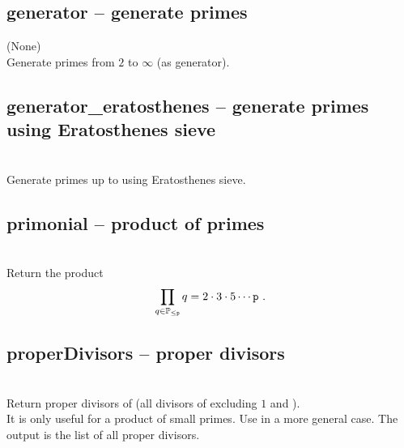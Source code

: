  \subsection{generator -- generate primes}
   {(None)}{}\\
   \spacing
   \quad Generate primes from $2$ to $\infty$ (as generator).\\
   \spacing
%
 \subsection{generator\_eratosthenes -- generate primes using Eratosthenes sieve}
   {}{}\\
   \spacing
   \quad Generate primes up to  using Eratosthenes sieve.\\
   \spacing
%
 \subsection{primonial -- product of primes}
   {}{}\\
   \spacing
   \quad Return the product
   \begin{equation*}
   \prod_{q \in \mathbb{P}_{\le \param{p}}} q=2\cdot 3\cdot 5\cdots \param{p}\ .
   \end{equation*}
   \spacing
%
 \subsection{properDivisors -- proper divisors}
   {}{}\\
   \spacing
   \quad Return proper divisors of  (all divisors of  excluding $1$ and ).\\
   \spacing
   \quad  It is only useful for a product of small primes.
   Use  in a more
   general case.
   \spacing
   \quad The output is the list of all proper divisors.\\
%
